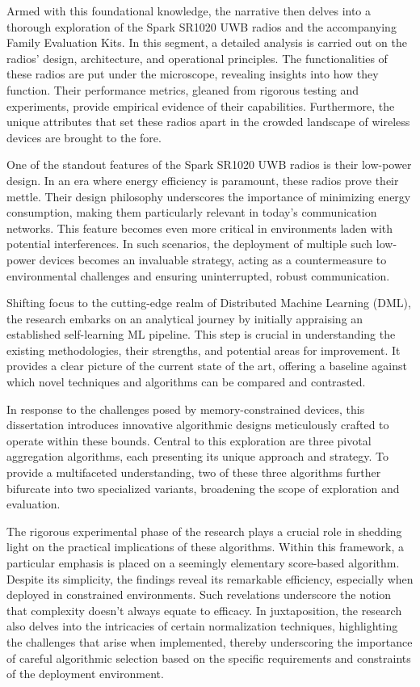 Armed with this foundational knowledge, the narrative then delves into a thorough exploration of the Spark SR1020 UWB radios and the accompanying Family Evaluation Kits. In this segment, a detailed analysis is carried out on the radios' design, architecture, and operational principles. The functionalities of these radios are put under the microscope, revealing insights into how they function. Their performance metrics, gleaned from rigorous testing and experiments, provide empirical evidence of their capabilities. Furthermore, the unique attributes that set these radios apart in the crowded landscape of wireless devices are brought to the fore.

One of the standout features of the Spark SR1020 UWB radios is their low-power design. In an era where energy efficiency is paramount, these radios prove their mettle. Their design philosophy underscores the importance of minimizing energy consumption, making them particularly relevant in today's communication networks. This feature becomes even more critical in environments laden with potential interferences. In such scenarios, the deployment of multiple such low-power devices becomes an invaluable strategy, acting as a countermeasure to environmental challenges and ensuring uninterrupted, robust communication.

Shifting focus to the cutting-edge realm of Distributed Machine Learning (DML), the research embarks on an analytical journey by initially appraising an established self-learning ML pipeline. This step is crucial in understanding the existing methodologies, their strengths, and potential areas for improvement. It provides a clear picture of the current state of the art, offering a baseline against which novel techniques and algorithms can be compared and contrasted.

In response to the challenges posed by memory-constrained devices, this dissertation introduces innovative algorithmic designs meticulously crafted to operate within these bounds. Central to this exploration are three pivotal aggregation algorithms, each presenting its unique approach and strategy. To provide a multifaceted understanding, two of these three algorithms further bifurcate into two specialized variants, broadening the scope of exploration and evaluation.

The rigorous experimental phase of the research plays a crucial role in shedding light on the practical implications of these algorithms. Within this framework, a particular emphasis is placed on a seemingly elementary score-based algorithm. Despite its simplicity, the findings reveal its remarkable efficiency, especially when deployed in constrained environments. Such revelations underscore the notion that complexity doesn't always equate to efficacy. In juxtaposition, the research also delves into the intricacies of certain normalization techniques, highlighting the challenges that arise when implemented, thereby underscoring the importance of careful algorithmic selection based on the specific requirements and constraints of the deployment environment.

